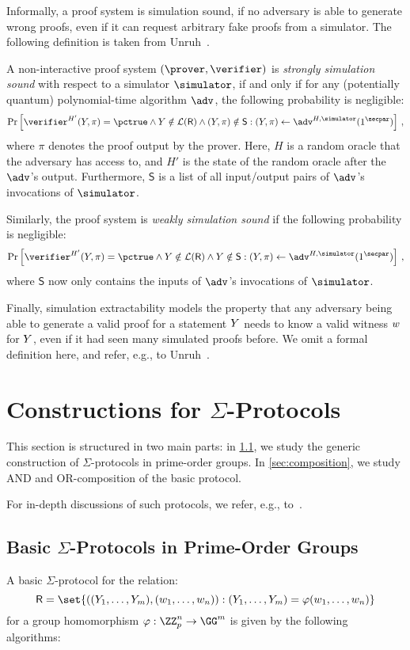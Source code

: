 \documentclass[runningheads]{llncs}
\begin{document}
Informally, a proof system is simulation sound, if no adversary is able to generate wrong proofs, even if it can request arbitrary fake proofs from a simulator.
The following definition is taken from Unruh~\cite{AC:Unruh17}.
\begin{definition}[Informal]
  A non-interactive proof system $(\prover,\verifier)$ is \emph{strongly simulation sound} with respect to a simulator $\simulator$, if and only if for any (potentially quantum) polynomial-time algorithm $\adv$, the following probability is negligible:
  $$
    \Pr\left[\verifier^{H'}(\statement,\pi)=\accept\land\statement\notin\lang(\relation)\land(\statement,\pi)\notin\mathsf{S} : (\statement,\pi)\gets\adv^{H,\simulator}(1^\secpar) \right]\,,
  $$
  where $\pi$ denotes the proof output by the prover.
  Here, $H$ is a random oracle that the adversary has access to, and $H'$ is the state of the random oracle after the $\adv$'s output.
  Furthermore, $\mathsf{S}$ is a list of all input/output pairs of $\adv$'s invocations of $\simulator$.

  Similarly, the proof system is \emph{weakly simulation sound} if the following probability is negligible:
  $$
    \Pr\left[\verifier^{H'}(\statement,\pi)=\accept\land\statement\notin\lang(\relation)\land\statement\notin\mathsf{S} : (\statement,\pi)\gets\adv^{H,\simulator}(1^\secpar) \right]\,,
  $$
  where $\mathsf{S}$ now only contains the inputs of $\adv$'s invocations of $\simulator$.
\end{definition}

Finally, simulation extractability models the property that any adversary being able to generate a valid proof for a statement $Y$ needs to know a valid witness $w$ for $Y$, even if it had seen many simulated proofs before.
We omit a formal definition here, and refer, e.g., to Unruh~\cite{AC:Unruh17}.


\section{Constructions for $\Sigma$-Protocols}

This section is structured in two main parts: in \cref{sec:basicsigma}, we study the generic construction of $\Sigma$-protocols in prime-order groups. In \cref{sec:composition}, we study AND and OR-composition of the basic protocol.

For in-depth discussions of such protocols, we refer, e.g., to~\cite{bangerter05,AFRICACRYPT:Maurer09,DBLP:journals/dcc/Maurer15}.
\subsection{Basic $\Sigma$-Protocols in Prime-Order Groups}\label{sec:basicsigma}
A basic $\Sigma$-protocol for the relation:
\[
  \relation=\set{((\statement_1,\dots,\statement_m),(w_1,\dots,w_n)) : (\statement_1,\dots,\statement_m)=\varphi(w_1,\dots,w_n)}
\]
 for a group homomorphism $\varphi:\ZZ_p^n\to\GG^m$ is given by the following algorithms:
\end{document}
